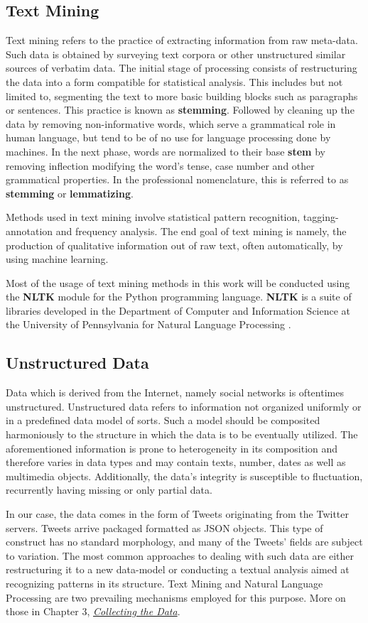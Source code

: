 	\subsection{Text Mining}
		Text mining refers to the practice of extracting information from raw meta-data. Such data is obtained by surveying text corpora or other unstructured similar sources of verbatim data. The initial stage of processing consists of restructuring the data into a form compatible for statistical analysis. This includes but not limited to, segmenting the text to more basic building blocks such as paragraphs or sentences. This practice is known as \textbf{stemming}. Followed by cleaning up the data by removing non-informative words, which serve a grammatical role in human language, but tend to be of no use for language processing done by machines. In the next phase, words are normalized to their base \textbf{stem} by removing inflection modifying the word's tense, case number and other grammatical properties. In the professional nomenclature, this is referred to as \textbf{stemming} or \textbf{lemmatizing}.
		\par
		Methods used in text mining involve statistical pattern recognition, tagging-annotation and frequency analysis. The end goal of text mining is namely, the production of qualitative information out of raw text, often automatically, by using machine learning.
		\par
		Most of the usage of text mining methods in this work will be conducted using the \textbf{NLTK} module for the Python programming language. \textbf{NLTK} is a suite of libraries developed in the Department of Computer and Information Science at the University of Pennsylvania for Natural Language Processing \cite{nltk_book}.

	\subsection{Unstructured Data}
		Data which is derived from the Internet, namely social networks is oftentimes unstructured. Unstructured data refers to information not organized uniformly or in a predefined data model of sorts. Such a model should be composited harmoniously to the structure in which the data is to be eventually utilized. The aforementioned information is prone to heterogeneity in its composition and therefore varies in data types and may contain texts, number, dates as well as multimedia objects. Additionally, the data's integrity is susceptible to fluctuation, recurrently having missing or only partial data.
		\par
		In our case, the data comes in the form of Tweets originating from the Twitter servers. Tweets arrive packaged formatted as JSON objects. This type of construct has no standard morphology, and many of the Tweets' fields are subject to variation. The most common approaches to dealing with such data are either restructuring it to a new data-model or conducting a textual analysis aimed at recognizing patterns in its structure. Text Mining and Natural Language Processing are two prevailing mechanisms employed for this purpose. More on those in Chapter 3, \hyperref[sec:collectdata]{\textit{Collecting the Data}}.
		
